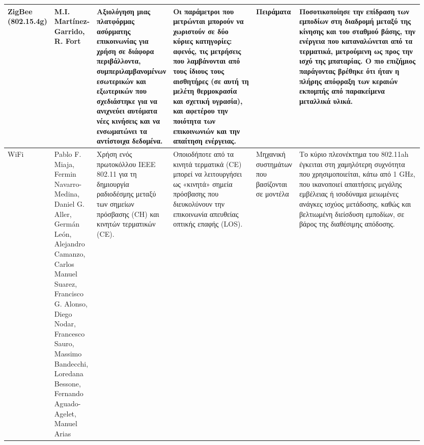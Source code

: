 \begin{landscape}
\begin{longtable}{p{0.1\linewidth}p{0.1\linewidth}p{0.15\linewidth}p{0.20\linewidth}p{0.1\linewidth}p{0.3\linewidth}}
        ZigBee (802.15.4g) & M.I. Martínez-Garrido, R. Fort \cite{martinez-garrido_experimental_2016} &
        Αξιολόγηση μιας πλατφόρμας ασύρματης επικοινωνίας για χρήση σε διάφορα περιβάλλοντα, 
        συμπεριλαμβανομένων εσωτερικών και εξωτερικών που σχεδιάστηκε για να ανιχνεύει αυτόματα νέες
        κινήσεις και να ενσωματώνει τα αντίστοιχα δεδομένα.&
        Οι παράμετροι που μετρώνται μπορούν να χωριστούν σε δύο
        κύριες κατηγορίες: αφενός, τις μετρήσεις που λαμβάνονται από τους ίδιους τους αισθητήρες 
        (σε αυτή τη μελέτη θερμοκρασία και σχετική υγρασία), και αφετέρου την ποιότητα των επικοινωνιών
        και την απαίτηση ενέργειας.& Πειράματα &
        Ποσοτικοποίησε την επίδραση των εμποδίων στη διαδρομή μεταξύ της κίνησης και του σταθμού βάσης, 
        την ενέργεια που καταναλώνεται από τα τερματικά, μετρούμενη ως προς την ισχύ της μπαταρίας. 
        Ο πιο επιζήμιος παράγοντας βρέθηκε ότι ήταν η πλήρης απόφραξη των κεραιών εκπομπής από 
        παρακείμενα μεταλλικά υλικά.\\
        \hline
        WiFi & Pablo F. Miaja, Fermin Navarro-Medina, Daniel G. Aller, Germán León,
        Alejandro Camanzo, Carlos Manuel Suarez, Francisco G. Alonso, Diego Nodar,
        Francesco Sauro, Massimo Bandecchi, Loredana Bessone, Fernando Aguado-Agelet, Manuel Arias
        & Χρήση ενός πρωτοκόλλου IEEE 802.11 για τη δημιουργία ραδιοδέσμης μεταξύ των σημείων πρόσβασης (CH)
        και κινητών τερματικών (CE).
        & Οποιοδήποτε από τα κινητά τερματικά (CE) μπορεί να λειτουργήσει ως «κινητά» σημεία πρόσβασης 
        που διευκολύνουν την επικοινωνία απευθείας οπτικής επαφής (LOS). &
        Μηχανική συστημάτων που βασίζονται σε μοντέλα &
        Το κύριο πλεονέκτημα του 802.11ah έγκειται στη χαμηλότερη συχνότητα που χρησιμοποιείται,
        κάτω από 1 GHz, που ικανοποιεί απαιτήσεις μεγάλης εμβέλειας ή ισοδύναμα μειωμένες ανάγκες
        ισχύος μετάδοσης, καθώς και βελτιωμένη διείσδυση εμποδίων, σε βάρος της διαθέσιμης απόδοσης.\\
        

\end{longtable}
\end{landscape}
